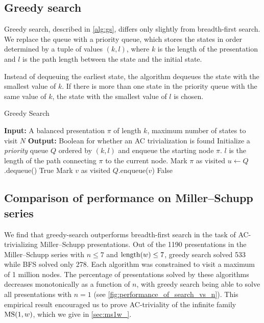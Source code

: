 \subsection{Greedy search}\label{ss:greedy_search}

Greedy search, described in \cref{alg:gs}, differs only slightly from breadth-first search. We replace the queue with a priority queue, which stores the states in order determined by a tuple of values $(k, l)$, where $k$ is the length of the presentation and $l$ is the path length between the state and the initial state.

Instead of dequeuing the earliest state, the algorithm dequeues the state with the smallest value of $k$. If there is more than one state in the priority queue with the same value of $k$, the state with the smallest value of $l$ is chosen.

\begin{algorithm}
	\caption{Greedy Search}\label{alg:gs}
	\begin{algorithmic}[1] %
		\State \textbf{Input:} A balanced presentation $\pi$ of length $k$, maximum number of states to visit $N$
		\State \textbf{Output:} Boolean for whether an AC trivialization is found
		\State Initialize a \textit{priority} queue $Q$ ordered by $(k, l)$ and enqueue the starting node $\pi$.
		$l$ is the length of the path connecting $\pi$ to the current node.
		\State Mark $\pi$ as visited
		\State $u \gets Q$.dequeue() 
		\State \Return True 
		\EndIf
		\State Mark $v$ as visited
		\State $Q$.enqueue($v$) 
		\EndIf
		\EndFor
		\EndWhile
		\State \Return False 
	\end{algorithmic}
\end{algorithm}

\subsection{Comparison of performance on Miller--Schupp series}\label{sec:search-ms}

We find that greedy-search outperforms breadth-first search in the task of AC-trivializing Miller--Schupp presentations. %
Out of the 1190 presentations in the Miller--Schupp series with $n \leq 7$ and $\operatorname{length}(w) \leq 7$, greedy search solved 533 while BFS solved only 278.
Each algorithm was constrained to visit a maximum of 1 million nodes.
The percentage of presentations solved by these algorithms decreases monotonically as a function of $n$, with greedy search being able to solve all presentations with $n=1$ (see \cref{fig:performance_of_search_vs_n}).
This empirical result encouraged us to prove AC-triviality of the infinite family $\text{MS}(1, w)$, which we give in \cref{sec:ms1w_}.

